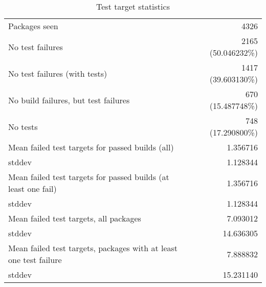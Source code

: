 \begin{table}[ht]
\caption{Test target statistics}
\label{table:test}
\begin{tabular}{|l|r|}
 \hline
  Packages seen & 4326 \\
  No test failures & 2165 (50.046232\%) \\
  No test failures (with tests) & 1417 (39.603130\%) \\
  No build failures, but test failures & 670 (15.487748\%) \\
  No tests & 748 (17.290800\%) \\
 \hline
  Mean failed test targets for passed builds (all) & 1.356716 \\
  stddev & 1.128344 \\
 \hline
  Mean failed test targets for passed builds (at least one fail) & 1.356716 \\
  stddev & 1.128344 \\
 \hline
  Mean failed test targets, all packages& 7.093012 \\
  stddev & 14.636305 \\
 \hline
  Mean failed test targets, packages with at least one test failure& 7.888832 \\
  stddev & 15.231140 \\
 \hline
\end{tabular}
\end{table}

